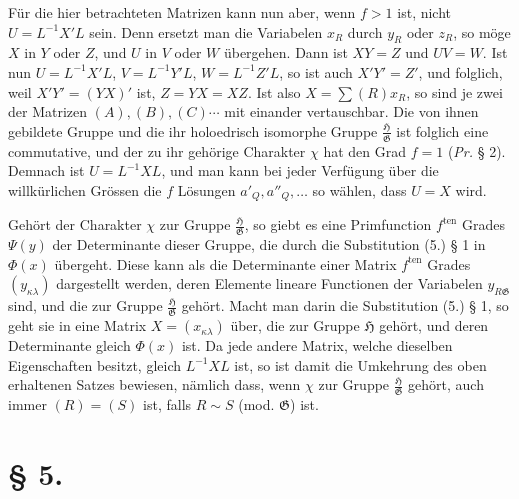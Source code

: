\documentclass[11pt]{article}
\newcommand{\Hgrp}{\mathfrak{H}}
\newcommand{\Ggrp}{\mathfrak{G}}
\newcommand{\ten}{\mathrm{ten}}
\begin{document}
Für die hier betrachteten Matrizen kann nun aber, wenn $f>1$ ist, nicht $U=L^{-1}X'L$ sein. Denn ersetzt man die Variabelen $x_R$ durch $y_R$ oder $z_R$, so möge $X$ in $Y$ oder $Z$, und $U$ in $V$ oder $W$ übergehen. Dann ist $XY=Z$ und $UV=W$. Ist nun $U=L^{-1}X'L$, $V=L^{-1}Y'L$, $W=L^{-1}Z'L$, so ist auch $X'Y'=Z'$, und folglich, weil $X'Y'=(YX)'$ ist, $Z=YX=XZ$. Ist also $X=\sum(R)x_R$, so sind je zwei der Matrizen $(A),(B),(C)\cdots$ mit einander vertauschbar. Die von ihnen gebildete Gruppe und die ihr holoedrisch isomorphe Gruppe $\frac{\Hgrp}{\Ggrp}$ ist folglich eine commutative, und der zu ihr gehörige Charakter $\chi$ hat den Grad $f=1$ (\emph{Pr.} § 2). Demnach ist $U=L^{-1}XL$, und man kann bei jeder Verfügung über die willkürlichen Grössen die $f$ Lösungen $a'_Q,a''_Q,\ldots$ so wählen, dass $U=X$ wird.

Gehört der Charakter $\chi$ zur Gruppe $\frac{\Hgrp}{\Ggrp}$, so giebt es eine Primfunction $f^{\ten}$ Grades $\Psi(y)$ der Determinante dieser Gruppe, die durch die Substitution (5.) § 1 in $\Phi(x)$ übergeht. Diese kann als die Determinante einer Matrix $f^{\ten}$ Grades $(y_{\kappa\lambda})$ dargestellt werden, deren Elemente lineare Functionen der Variabelen $y_{R\Ggrp}$ sind, und die zur Gruppe $\frac{\Hgrp}{\Ggrp}$ gehört. Macht man darin die Substitution (5.) § 1, so geht sie in eine Matrix $X=(x_{\kappa\lambda})$ über, die zur Gruppe $\Hgrp$ gehört, und deren Determinante gleich $\Phi(x)$ ist. Da jede andere Matrix, welche dieselben Eigenschaften besitzt, gleich $L^{-1}XL$ ist, so ist damit die Umkehrung des oben erhaltenen Satzes bewiesen, nämlich dass, wenn $\chi$ zur Gruppe $\frac{\Hgrp}{\Ggrp}$ gehört, auch immer $(R)=(S)$ ist, falls $R\sim S$ (mod. $\Ggrp$) ist.

\section*{§ 5.}
\end{document}

